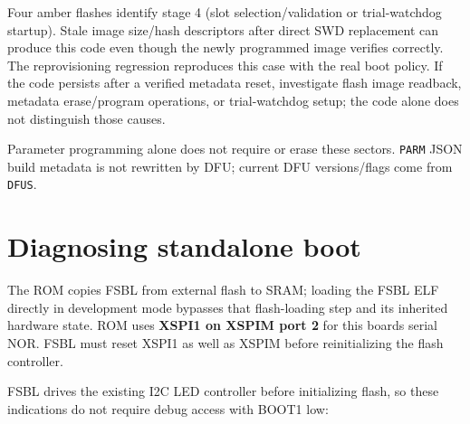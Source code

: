 \documentclass[10pt,a4paper,oneside]{report}
\begin{document}
Four amber flashes identify stage 4 (slot selection/validation or trial-watchdog startup). Stale image size/hash descriptors after direct SWD replacement can produce this code even though the newly programmed image verifies correctly. The reprovisioning regression reproduces this case with the real boot policy. If the code persists after a verified metadata reset, investigate flash image readback, metadata erase/program operations, or trial-watchdog setup; the code alone does not distinguish those causes.

Parameter programming alone does not require or erase these sectors. \texttt{PARM} JSON build metadata is not rewritten by DFU; current DFU versions/flags come from \texttt{DFUS}.

\section{Diagnosing standalone boot}\label{wiki-firmware-firmware-updates--diagnosing-standalone-boot}

The ROM copies FSBL from external flash to SRAM; loading the FSBL ELF directly in development mode bypasses that flash-loading step and its inherited hardware state. ROM uses \textbf{XSPI1 on XSPIM port 2} for this board\textquotesingle s serial NOR. FSBL must reset XSPI1 as well as XSPIM before reinitializing the flash controller.

FSBL drives the existing I2C LED controller before initializing flash, so these indications do not require debug access with BOOT1 low:
\end{document}
